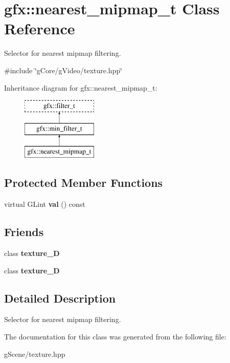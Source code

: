 \hypertarget{classgfx_1_1nearest__mipmap__t}{\section{gfx\-:\-:nearest\-\_\-mipmap\-\_\-t Class Reference}
\label{classgfx_1_1nearest__mipmap__t}
}


Selector for nearest mipmap filtering.  




{\ttfamily \#include \char`\"{}g\-Core/g\-Video/texture.\-hpp\char`\"{}}

Inheritance diagram for gfx\-:\-:nearest\-\_\-mipmap\-\_\-t\-:\begin{figure}[H]
\begin{center}
\leavevmode
\includegraphics[height=3.000000cm]{classgfx_1_1nearest__mipmap__t}
\end{center}
\end{figure}
\subsection*{Protected Member Functions}
\begin{DoxyCompactItemize}
\item 
\hypertarget{classgfx_1_1nearest__mipmap__t_ac1bf4967d54ebe3b79956869529fe942}{virtual G\-Lint {\bfseries val} () const }\label{classgfx_1_1nearest__mipmap__t_ac1bf4967d54ebe3b79956869529fe942}

\end{DoxyCompactItemize}
\subsection*{Friends}
\begin{DoxyCompactItemize}
\item 
\hypertarget{classgfx_1_1nearest__mipmap__t_a2039d67f6166ccf823c78e3476aad9aa}{class {\bfseries texture\-\_\-D}}\label{classgfx_1_1nearest__mipmap__t_a2039d67f6166ccf823c78e3476aad9aa}

\item 
\hypertarget{classgfx_1_1nearest__mipmap__t_a22ad86ef46c3b17357a0cd59e50bc7dd}{class {\bfseries texture\-\_\-D}}\label{classgfx_1_1nearest__mipmap__t_a22ad86ef46c3b17357a0cd59e50bc7dd}

\end{DoxyCompactItemize}


\subsection{Detailed Description}
Selector for nearest mipmap filtering. 

The documentation for this class was generated from the following file\-:\begin{DoxyCompactItemize}
\item 
g\-Scene/texture.\-hpp\end{DoxyCompactItemize}
